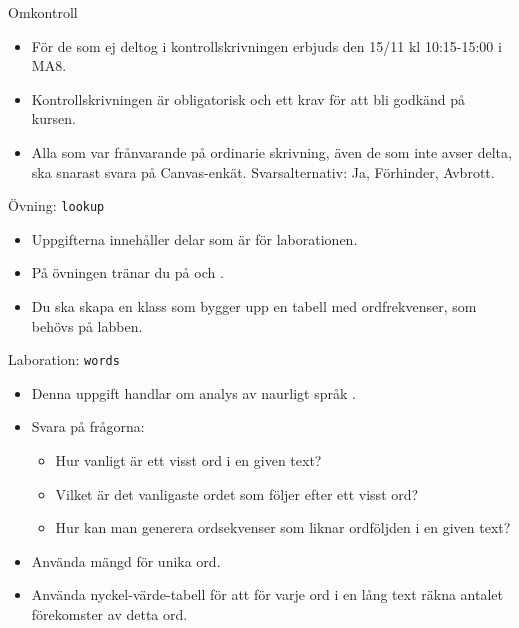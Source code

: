 

\ifkompendium\else
\begin{Slide}{Omkontroll}
\begin{itemize}
\item För de som ej deltog i kontrollskrivningen erbjuds  den 15/11 kl 10:15-15:00 i MA8. 
\item Kontrollskrivningen är obligatorisk och ett krav för att bli godkänd på kursen.
\item Alla som var frånvarande på ordinarie skrivning, även de som inte avser delta, ska snarast svara på Canvas-enkät. Svarsalternativ: Ja, Förhinder, Avbrott.
\end{itemize}  
\end{Slide}
\fi


\begin{Slide}{Övning: \texttt{lookup}}
\begin{itemize}
  \item Uppgifterna innehåller delar som är  för laborationen.
  \item På övningen tränar du på  och .
  \item Du ska skapa en klass  som bygger upp en tabell med ordfrekvenser, som behövs på labben.
\end{itemize}
\end{Slide}

\begin{Slide}{Laboration: \texttt{words}}
\begin{itemize}
  \item Denna uppgift handlar om analys av naurligt språk .
  \item Svara på frågorna:
  \begin{itemize}%
  \item Hur vanligt är ett visst ord i en given text?
  \item Vilket är det vanligaste ordet som följer efter ett visst ord?
  \item Hur kan man generera ordsekvenser som liknar ordföljden i en given text?
  \end{itemize}
\item Använda mängd för unika ord.
\item Använda nyckel-värde-tabell för att för varje ord i en lång text räkna antalet förekomster av detta ord.
\end{itemize}
\end{Slide}


